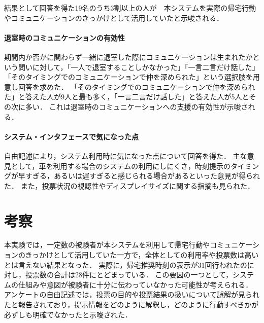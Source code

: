 %

結果として回答を得た19名のうち3割以上の人が　本システムを実際の帰宅行動やコミュニケーションのきっかけとして活用していたと示唆される．

\paragraph{退室時のコミュニケーションの有効性}
期間内か否かに関わらず一緒に退室した際にコミュニケーションは生まれたかという問いに対して，「一人で退室することしかなかった」「一言二言だけ話した」「そのタイミングでのコミュニケーションで仲を深められた」という選択肢を用意し回答を求めた．
「そのタイミングでのコミュニケーションで仲を深められた」と答えた人が9人と最も多く，「一言二言だけ話した」と答えた人が5人とその次に多い．
これは退室時のコミュニケーションへの支援の有効性が示唆される．


\paragraph{システム・インタフェースで気になった点}%
自由記述により，システム利用時に気になった点について回答を得た．
主な意見として，車を利用する場合のシステムの利用にしにくさ，時刻提示のタイミングが早すぎる，あるいは遅すぎると感じられる場合があるといった意見が得られた．
また，投票状況の視認性やディスプレイサイズに関する指摘も見られた．




\section{考察}
本実験では，一定数の被験者が本システムを利用して帰宅行動やコミュニケーションのきっかけとして活用していた一方で，全体としての利用率や投票数は高いとは言えない結果となった．
実際に，帰宅推奨時刻の表示が31回行われたのに対し，投票数の合計は28件にとどまっている．
この要因の一つとして，システムの仕組みや意図が被験者に十分に伝わっていなかった可能性が考えられる．
アンケートの自由記述では，投票の目的や投票結果の扱いについて誤解が見られたと報告されており，提示情報をどのように解釈し，どのように行動すべきかが必ずしも明確でなかったと示唆された．

